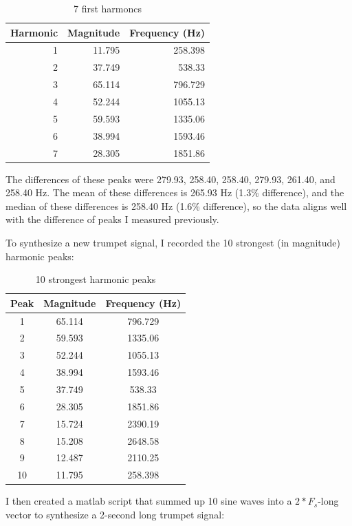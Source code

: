 \documentclass[11pt]{article}
\begin{document}
\begin{table}[H]
	\centering
	\begin{tabular}{rrr}\toprule
		Harmonic & Magnitude & Frequency (Hz) \\\midrule

		1 & 11.795 & 258.398 \\
		2 & 37.749 & 538.33  \\
		3 & 65.114 & 796.729 \\
		4 & 52.244 & 1055.13 \\
		5 & 59.593 & 1335.06 \\
		6 & 38.994 & 1593.46 \\
		7 & 28.305 & 1851.86 \\\bottomrule
	\end{tabular}
	\caption{\label{tab:first-harmonics}7 first harmoncs}
\end{table}

The differences of these peaks were 279.93, 258.40, 258.40, 279.93, 261.40, and 258.40 Hz.
The mean of these differences is 265.93 Hz (1.3\% difference), and the median of these differences is 258.40 Hz (1.6\% difference), so the data aligns well with the difference of peaks I measured previously.

To synthesize a new trumpet signal, I recorded the 10 strongest (in magnitude) harmonic peaks:

\begin{table}[H]
	\centering
	\begin{tabular}{c c c}\toprule
		Peak & Magnitude & Frequency (Hz) \\\midrule

		 1 & 65.114 & 796.729 \\
		 2 & 59.593 & 1335.06 \\
		 3 & 52.244 & 1055.13 \\
		 4 & 38.994 & 1593.46 \\
		 5 & 37.749 & 538.33  \\
		 6 & 28.305 & 1851.86 \\
		 7 & 15.724 & 2390.19 \\
		 8 & 15.208 & 2648.58 \\
		 9 & 12.487 & 2110.25 \\
		10 & 11.795 & 258.398 \\\bottomrule
	\end{tabular}
	\caption{\label{tab:strongest-harmonics}10 strongest harmonic peaks}
\end{table}

I then created a matlab script that summed up 10 sine waves into a $2*F_s$-long vector to synthesize a 2-second long trumpet signal:
\end{document}
